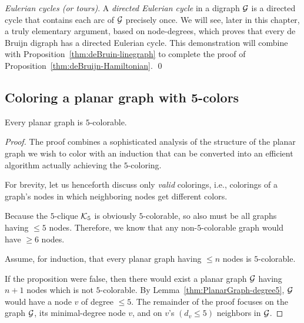 {\medskip

{\it Eulerian cycles (or tours)}. 
 A {\it directed Eulerian cycle} in a digraph
$\mbox{$\cal G$}$ is a directed cycle that contains each arc of $\mbox{$\cal G$}$ precisely
once.  We will see, later in this chapter, a truly elementary
argument, based on node-degrees, which proves that every de Bruijn
digraph has a directed Eulerian cycle.  This demonstration will
combine with Proposition~\ref{thm:deBruin-linegraph} to complete the
proof of Proposition~\ref{thm:deBruijn-Hamiltonian}.  \qed


\subsection{Coloring a planar graph with 5-colors}

\begin{prop}
\label{thm:P-5-colorability}
Every planar graph is $5$-colorable.
\end{prop}


\begin{proof}
The proof combines a sophisticated analysis of the structure of the
planar graph we wish to color with an induction that can be converted
into an efficient algorithm actually achieving the $5$-coloring.

\smallskip

For brevity, let us henceforth discuss only {\em valid} colorings,
i.e., colorings of a graph's nodes in which neighboring nodes get
different colors.

\smallskip

Because the $5$-clique $\mbox{$\cal K$}_5$ is obviously $5$-colorable, so also must
be all graphs having $\leq 5$ nodes.  Therefore, we know that any
non-$5$-colorable graph would have $\geq 6$ nodes.

\smallskip

Assume, for induction, that every planar graph having $\leq n$ nodes
is $5$-colorable.

\smallskip

If the proposition were false, then there would exist a planar graph
$\mbox{$\cal G$}$ having $n+1$ nodes which is not $5$-colorable.  By
Lemma~\ref{thm:PlanarGraph-degree5}, $\mbox{$\cal G$}$ would have a node $v$ of
degree $\leq 5$.  The remainder of the proof focuses on the graph
$\mbox{$\cal G$}$, its minimal-degree node $v$, and on $v$'s $(d_v \leq 5)$
neighbors in $\mbox{$\cal G$}$.


\end{proof}}
